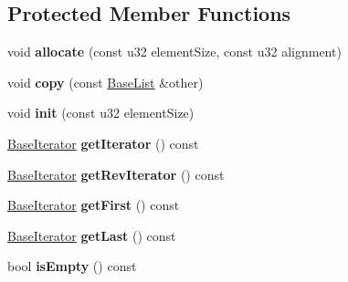 \subsection*{Protected Member Functions}
\begin{DoxyCompactItemize}
\item 
void {\bfseries allocate} (const u32 element\+Size, const u32 alignment)\hypertarget{classDE_1_1BaseList_a5fc8f3ca27310c6c8e55e4edce149be8}{}\label{classDE_1_1BaseList_a5fc8f3ca27310c6c8e55e4edce149be8}

\item 
void {\bfseries copy} (const \hyperlink{classDE_1_1BaseList}{Base\+List} \&other)\hypertarget{classDE_1_1BaseList_a3c678d1a2f536c642abe5a7dd800cc79}{}\label{classDE_1_1BaseList_a3c678d1a2f536c642abe5a7dd800cc79}

\item 
void {\bfseries init} (const u32 element\+Size)\hypertarget{classDE_1_1BaseList_a78a0991d0bcd5506b284140df511e08f}{}\label{classDE_1_1BaseList_a78a0991d0bcd5506b284140df511e08f}

\item 
\hyperlink{classDE_1_1BaseList_1_1BaseIterator}{Base\+Iterator} {\bfseries get\+Iterator} () const \hypertarget{classDE_1_1BaseList_ad3f52d9aeab85bad232394ad0809cc40}{}\label{classDE_1_1BaseList_ad3f52d9aeab85bad232394ad0809cc40}

\item 
\hyperlink{classDE_1_1BaseList_1_1BaseIterator}{Base\+Iterator} {\bfseries get\+Rev\+Iterator} () const \hypertarget{classDE_1_1BaseList_a41028ea5b53c8f9229d2b0e127fbbb9c}{}\label{classDE_1_1BaseList_a41028ea5b53c8f9229d2b0e127fbbb9c}

\item 
\hyperlink{classDE_1_1BaseList_1_1BaseIterator}{Base\+Iterator} {\bfseries get\+First} () const \hypertarget{classDE_1_1BaseList_a9cdf4d25a7e575ca5e8398c6c58ddb18}{}\label{classDE_1_1BaseList_a9cdf4d25a7e575ca5e8398c6c58ddb18}

\item 
\hyperlink{classDE_1_1BaseList_1_1BaseIterator}{Base\+Iterator} {\bfseries get\+Last} () const \hypertarget{classDE_1_1BaseList_af797b5d09fab2c05ca9cab7bb7f1db32}{}\label{classDE_1_1BaseList_af797b5d09fab2c05ca9cab7bb7f1db32}

\item 
bool {\bfseries is\+Empty} () const \hypertarget{classDE_1_1BaseList_aad916f630075cf2df2501e98ebfa23de}{}\label{classDE_1_1BaseList_aad916f630075cf2df2501e98ebfa23de}


\end{DoxyCompactItemize}

